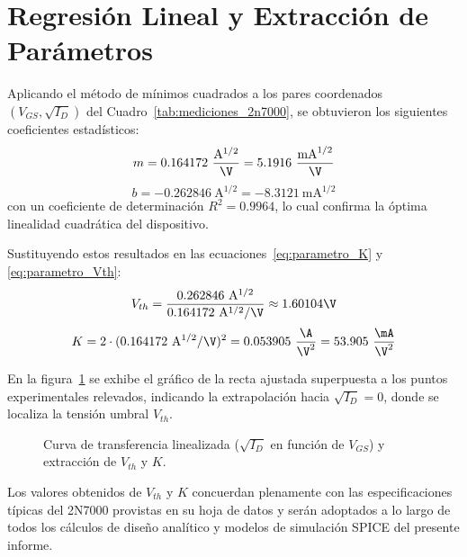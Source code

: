 \section{Regresión Lineal y Extracción de Parámetros}

Aplicando el método de mínimos cuadrados a los pares coordenados $(V_{GS}, \sqrt{I_D})$ del Cuadro~\ref{tab:mediciones_2n7000},
se obtuvieron los siguientes coeficientes estadísticos:
\begin{equation}
  m = 0.164172\ \frac{\mathrm{A}^{1/2}}{\V} = 5.1916\ \frac{\mathrm{mA}^{1/2}}{\V}
\end{equation}
\begin{equation}
  b = -0.262846\ \mathrm{A}^{1/2} = -8.3121\ \mathrm{mA}^{1/2}
\end{equation}
con un coeficiente de determinación $R^2 = 0.9964$, lo cual confirma la óptima linealidad cuadrática del dispositivo.

Sustituyendo estos resultados en las ecuaciones~\eqref{eq:parametro_K} y \eqref{eq:parametro_Vth}:
\begin{equation}
  V_{th} = \frac{0.262846\ \mathrm{A}^{1/2}}{0.164172\ \mathrm{A}^{1/2}/\V} \approx 1.60104\V
  \label{eq:Vth_calculado}
\end{equation}
\begin{equation}
  K = 2 \cdot (0.164172\ \mathrm{A}^{1/2}/\V)^2 = 0.053905\ \frac{\A}{\V^2} = 53.905\ \frac{\mA}{\V^2}
  \label{eq:K_calculado}
\end{equation}

En la figura~\ref{fig:plot_caracterizacion} se exhibe el gráfico de la recta ajustada superpuesta a los puntos
experimentales relevados, indicando la extrapolación hacia $\sqrt{I_D} = 0$, donde se localiza la tensión umbral $V_{th}$.

\begin{figure}[!ht]
  \centering
  
  \caption{Curva de transferencia linealizada ($\sqrt{I_D}$ en función de $V_{GS}$) y extracción de $V_{th}$ y $K$.}
  \label{fig:plot_caracterizacion}
\end{figure}

Los valores obtenidos de $V_{th}$ y $K$ concuerdan plenamente con las especificaciones
típicas del 2N7000 provistas en su hoja de datos y serán adoptados a lo largo de todos los cálculos de diseño analítico
y modelos de simulación SPICE del presente informe.
